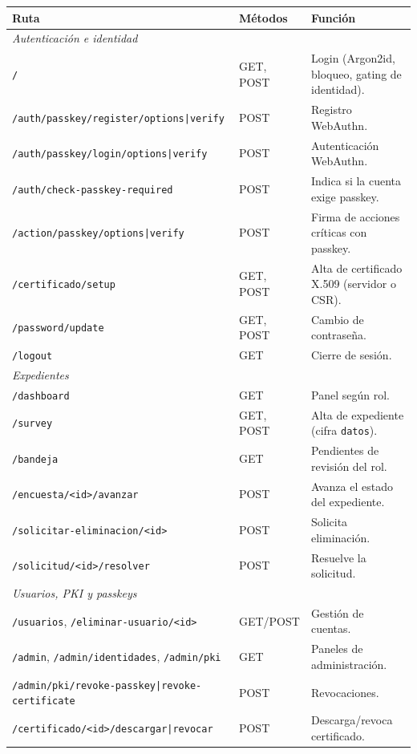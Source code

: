 \documentclass[10pt,letterpaper]{report}
\begin{document}
\begin{table}[h]
\centering
\renewcommand{\arraystretch}{1.15}
\footnotesize
\begin{tabularx}{\textwidth}{l l X}
\toprule
\textbf{Ruta} & \textbf{M\'etodos} & \textbf{Funci\'on} \\
\midrule
\multicolumn{3}{l}{\textit{Autenticaci\'on e identidad}}\\
\texttt{/} & GET, POST & Login (Argon2id, bloqueo, gating de identidad). \\
\texttt{/auth/passkey/register/options|verify} & POST & Registro WebAuthn. \\
\texttt{/auth/passkey/login/options|verify} & POST & Autenticaci\'on WebAuthn. \\
\texttt{/auth/check-passkey-required} & POST & Indica si la cuenta exige passkey. \\
\texttt{/action/passkey/options|verify} & POST & Firma de acciones cr\'iticas con passkey. \\
\texttt{/certificado/setup} & GET, POST & Alta de certificado X.509 (servidor o CSR). \\
\texttt{/password/update} & GET, POST & Cambio de contrase\~na. \\
\texttt{/logout} & GET & Cierre de sesi\'on. \\
\midrule
\multicolumn{3}{l}{\textit{Expedientes}}\\
\texttt{/dashboard} & GET & Panel seg\'un rol. \\
\texttt{/survey} & GET, POST & Alta de expediente (cifra \texttt{datos}). \\
\texttt{/bandeja} & GET & Pendientes de revisi\'on del rol. \\
\texttt{/encuesta/<id>/avanzar} & POST & Avanza el estado del expediente. \\
\texttt{/solicitar-eliminacion/<id>} & POST & Solicita eliminaci\'on. \\
\texttt{/solicitud/<id>/resolver} & POST & Resuelve la solicitud. \\
\midrule
\multicolumn{3}{l}{\textit{Usuarios, PKI y passkeys}}\\
\texttt{/usuarios}, \texttt{/eliminar-usuario/<id>} & GET/POST & Gesti\'on de cuentas. \\
\texttt{/admin}, \texttt{/admin/identidades}, \texttt{/admin/pki} & GET & Paneles de administraci\'on. \\
\texttt{/admin/pki/revoke-passkey|revoke-certificate} & POST & Revocaciones. \\
\texttt{/certificado/<id>/descargar|revocar} & POST & Descarga/revoca certificado. \\

\end{tabularx}
\end{table}
\end{document}
